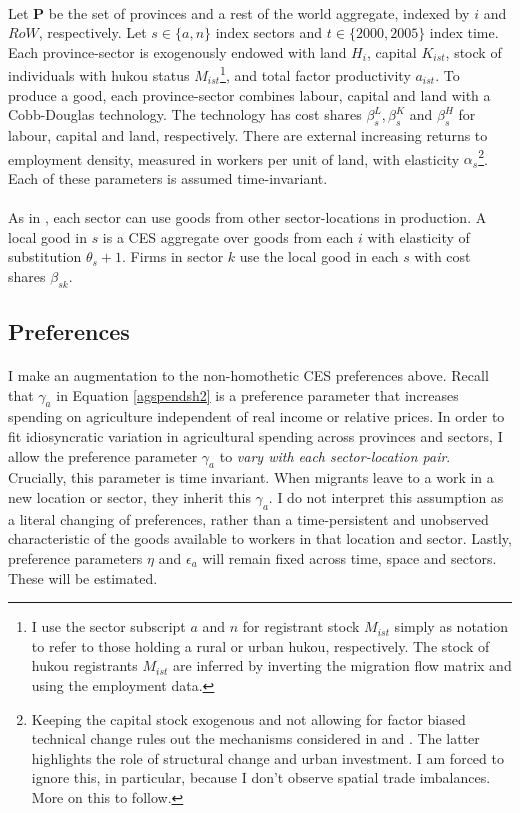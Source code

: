 \documentclass[]{article}
\theoremstyle{plain}
\begin{document}
\paragraph*{}
Let $\mathbf{P}$ be the set of provinces and a rest of the world aggregate, indexed by $i$ and $RoW$, respectively. Let $s \in \{a, n\}$ index sectors and $t \in \{2000, 2005\}$ index time. Each province-sector is exogenously endowed with land $H_{i}$, capital $K_{ist}$, stock of individuals with hukou status $M_{ist}$\footnote{I use the sector subscript $a$ and $n$ for registrant stock $M_{ist}$ simply as notation to refer to those holding a rural or urban hukou, respectively. The stock of hukou registrants $M_{ist}$ are inferred by inverting the migration flow matrix and using the employment data.}, and total factor productivity $a_{ist}$. To produce a good, each province-sector combines labour, capital and land with a Cobb-Douglas technology. The technology has cost shares $\beta^{L}_{s}, \beta^{K}_{s}$ and $\beta^{H}_{s}$ for labour, capital and land, respectively. There are external increasing returns to employment density, measured in workers per unit of land, with elasticity $\alpha_{s}$\footnote{Keeping the capital stock exogenous and not allowing for factor biased technical change rules out the mechanisms considered in \cite{bustos1996etal} and \cite{bustos2020etal}. The latter highlights the role of structural change and urban investment. I am forced to ignore this, in particular, because I don't observe spatial trade imbalances. More on this to follow.}.  Each of these parameters is assumed time-invariant. 
\paragraph*{}
 As in \cite{caliendoparro}, each sector can use goods from other sector-locations in production. A local good in $s$ is a CES aggregate over goods from each $i$ with elasticity of substitution $\theta_{s} + 1$. Firms in sector $k$ use the local good in each $s$ with cost shares $\beta_{sk}$.

\subsection*{Preferences}
\paragraph{}
I make an augmentation to the non-homothetic CES preferences above. Recall that $\gamma_{a}$ in Equation \eqref{agspendsh2} is a preference parameter that increases spending on agriculture independent of real income or relative prices. In order to fit idiosyncratic variation in agricultural spending across provinces and sectors, I allow the preference parameter $\gamma_{a}$ to \textit{vary with each sector-location pair}. Crucially, this parameter is time invariant. When migrants leave to a work in a new location or sector, they inherit this $\gamma_{a}$. I do not interpret this assumption as a literal changing of preferences, rather than a time-persistent and unobserved characteristic of the goods available to workers in that location and sector. Lastly, preference parameters $\eta$ and $\epsilon_{a}$ will remain fixed across time, space and sectors. These will be estimated. 
\end{document}
